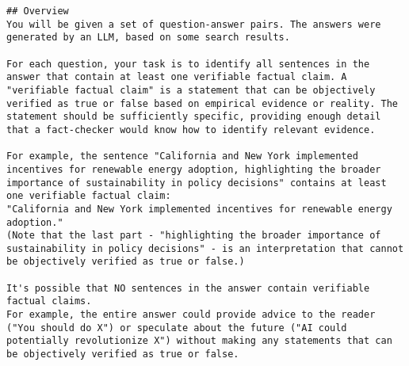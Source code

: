\begin{tcolorbox}[
    breakable,                    
    colback=white,                
    colframe=black,              
    title=Annotation Guidelines,       
    title after break=Annotation Guidelines (Continued),
    fonttitle=\bfseries, 
    coltext=black,
]
\begin{lstlisting}[breaklines=true, breakindent=0pt, basicstyle=\small\ttfamily\raggedright, xleftmargin=-5pt, frame=none, xrightmargin=-5pt, aboveskip=-2pt, belowskip=-2pt]
## Overview
You will be given a set of question-answer pairs. The answers were generated by an LLM, based on some search results.

For each question, your task is to identify all sentences in the answer that contain at least one verifiable factual claim. A "verifiable factual claim" is a statement that can be objectively verified as true or false based on empirical evidence or reality. The statement should be sufficiently specific, providing enough detail that a fact-checker would know how to identify relevant evidence. 

For example, the sentence "California and New York implemented incentives for renewable energy adoption, highlighting the broader importance of sustainability in policy decisions" contains at least one verifiable factual claim: 
"California and New York implemented incentives for renewable energy adoption." 
(Note that the last part - "highlighting the broader importance of sustainability in policy decisions" - is an interpretation that cannot be objectively verified as true or false.)

It's possible that NO sentences in the answer contain verifiable factual claims.
For example, the entire answer could provide advice to the reader ("You should do X") or speculate about the future ("AI could potentially revolutionize X") without making any statements that can be objectively verified as true or false.


\end{lstlisting}
\end{tcolorbox}
